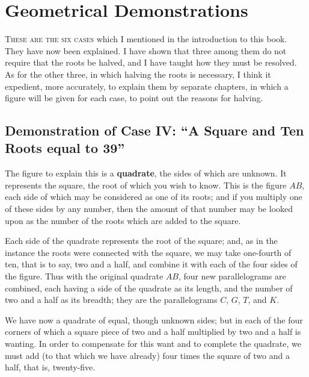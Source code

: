\documentclass[11pt,a4paper,openany,oneside]{book}
\begin{document}
\newpage

\chapter{Geometrical Demonstrations}
\label{ch:geom}

\lettrine[lines=3, lhang=0.33, nindent=0em, findent=3pt]{
\textcolor{dropgold}{T}}{hese are the six cases} which I mentioned in the introduction to this
book. They have now been explained. I have shown that three among them do not
require that the roots be halved, and I have taught how they must be resolved.
As for the other three, in which halving the roots is necessary, I think it
expedient, more accurately, to explain them by separate chapters, in which a
figure will be given for each case, to point out the reasons for halving.

\section{Demonstration of Case IV: ``A Square and Ten Roots equal to 39''}

The figure to explain this is a \textbf{quadrate}, the sides of which are
unknown. It represents the square, the root of which you wish to know. This
is the figure $AB$, each side of which may be considered as one of its roots;
and if you multiply one of these sides by any number, then the amount of that
number may be looked upon as the number of the roots which are added to the
square.

Each side of the quadrate represents the root of the square; and, as in the
instance the roots were connected with the square, we may take one-fourth of
ten, that is to say, two and a half, and combine it with each of the four
sides of the figure. Thus with the original quadrate $AB$, four new
parallelograms are combined, each having a side of the quadrate as its
length, and the number of two and a half as its breadth; they are the
parallelograms $C$, $G$, $T$, and $K$.

We have now a quadrate of equal, though unknown sides; but in each of the
four corners of which a square piece of two and a half multiplied by two and
a half is wanting. In order to compensate for this want and to complete the
quadrate, we must add (to that which we have already) four times the square
of two and a half, that is, twenty-five.
\end{document}
